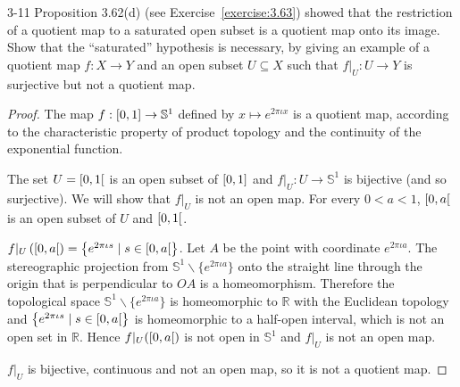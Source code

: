 \begin{problem}{3-11}
Proposition 3.62(d) (see Exercise~\ref{exercise:3.63}) showed that the restriction of a quotient map to a saturated open subset is a quotient map onto its image. Show that the ``saturated'' hypothesis is necessary, by giving an example of a quotient map $f: X \to Y$ and an open subset $U\subseteq X$ such that $f\vert_{U}: U\to Y$ is surjective but not a quotient map.
\end{problem}

\begin{proof}
    The map $f: \left[{0, 1}\right] \to \mathbb{S}^{1}$ defined by $x\mapsto e^{2\pi\iota x}$ is a quotient map, according to the characteristic property of product topology and the continuity of the exponential function.

    The set $U = \left[{0, 1}\right[$ is an open subset of $\left[{0, 1}\right]$ and $f\vert_{U}: U\to \mathbb{S}^{1}$ is bijective (and so surjective). We will show that $f\vert_{U}$ is not an open map. For every $0 < a < 1$, $\left[{0, a}\right[$ is an open subset of $U$ and $\left[{0, 1}\right[$.

    $f\vert_{U}\left(\left[{0, a}\right[\right) = \left\{ e^{2\pi\iota s} \mid s\in\left[{0, a}\right[ \right\}$. Let $A$ be the point with coordinate $e^{2\pi\iota a}$. The stereographic projection from $\mathbb{S}^{1}\smallsetminus\{e^{2\pi\iota a}\}$ onto the straight line through the origin that is perpendicular to $OA$ is a homeomorphism. Therefore the topological space $\mathbb{S}^{1}\smallsetminus \{ e^{2\pi\iota a} \}$ is homeomorphic to $\mathbb{R}$ with the Euclidean topology and $\left\{ e^{2\pi\iota s} \mid s\in\left[{0, a}\right[ \right\}$ is homeomorphic to a half-open interval, which is not an open set in $\mathbb{R}$. Hence $f\vert_{U}(\left[{0, a}\right[)$ is not open in $\mathbb{S}^{1}$ and $f\vert_{U}$ is not an open map.

    $f\vert_{U}$ is bijective, continuous and not an open map, so it is not a quotient map.
\end{proof}

